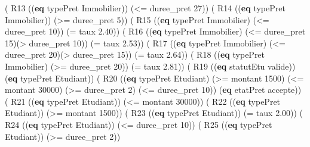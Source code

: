 \documentclass[
]{article}
\newenvironment{Shaded}{}{}
\newcommand{\DecValTok}[1]{\textcolor[rgb]{0.25,0.63,0.44}{#1}}
\newcommand{\FloatTok}[1]{\textcolor[rgb]{0.25,0.63,0.44}{#1}}
\newcommand{\KeywordTok}[1]{\textcolor[rgb]{0.00,0.44,0.13}{\textbf{#1}}}
\newcommand{\NormalTok}[1]{#1}
\newcommand{\OperatorTok}[1]{\textcolor[rgb]{0.40,0.40,0.40}{#1}}
\begin{document}
\begin{Shaded}
\begin{Highlighting}[]
\NormalTok{( R13 ((}\KeywordTok{eq}\NormalTok{ typePret Immobilier)) (}\OperatorTok{\textless{}=}\NormalTok{ duree\_pret }\DecValTok{27}\NormalTok{))}
\NormalTok{( R14 ((}\KeywordTok{eq}\NormalTok{ typePret Immobilier)) (}\OperatorTok{\textgreater{}=}\NormalTok{ duree\_pret }\DecValTok{5}\NormalTok{))}
\NormalTok{( R15 ((}\KeywordTok{eq}\NormalTok{ typePret Immobilier) (}\OperatorTok{\textless{}=}\NormalTok{ duree\_pret }\DecValTok{10}\NormalTok{)) (}\OperatorTok{=}\NormalTok{ taux }\FloatTok{2.40}\NormalTok{))}
\NormalTok{( R16 ((}\KeywordTok{eq}\NormalTok{ typePret Immobilier) (}\OperatorTok{\textless{}=}\NormalTok{ duree\_pret }\DecValTok{15}\NormalTok{)(}\OperatorTok{\textgreater{}}\NormalTok{ duree\_pret }\DecValTok{10}\NormalTok{)) (}\OperatorTok{=}\NormalTok{ taux }\FloatTok{2.53}\NormalTok{))}
\NormalTok{( R17 ((}\KeywordTok{eq}\NormalTok{ typePret Immobilier) (}\OperatorTok{\textless{}=}\NormalTok{ duree\_pret }\DecValTok{20}\NormalTok{)(}\OperatorTok{\textgreater{}}\NormalTok{ duree\_pret }\DecValTok{15}\NormalTok{)) (}\OperatorTok{=}\NormalTok{ taux }\FloatTok{2.64}\NormalTok{))}
\NormalTok{( R18 ((}\KeywordTok{eq}\NormalTok{ typePret Immobilier) (}\OperatorTok{\textgreater{}=}\NormalTok{ duree\_pret }\DecValTok{20}\NormalTok{)) (}\OperatorTok{=}\NormalTok{ taux }\FloatTok{2.81}\NormalTok{))}
\NormalTok{( R19 ((}\KeywordTok{eq}\NormalTok{ statutEtu valide)) (}\KeywordTok{eq}\NormalTok{ typePret Etudiant))}
\NormalTok{( R20 ((}\KeywordTok{eq}\NormalTok{ typePret Etudiant) (}\OperatorTok{\textgreater{}=}\NormalTok{ montant }\DecValTok{1500}\NormalTok{) (}\OperatorTok{\textless{}=}\NormalTok{ montant }\DecValTok{30000}\NormalTok{) }
\NormalTok{(}\OperatorTok{\textgreater{}=}\NormalTok{ duree\_pret }\DecValTok{2}\NormalTok{) (}\OperatorTok{\textless{}=}\NormalTok{ duree\_pret }\DecValTok{10}\NormalTok{)) (}\KeywordTok{eq}\NormalTok{ etatPret accepte))}
\NormalTok{( R21 ((}\KeywordTok{eq}\NormalTok{ typePret Etudiant)) (}\OperatorTok{\textless{}=}\NormalTok{ montant }\DecValTok{30000}\NormalTok{))}
\NormalTok{( R22 ((}\KeywordTok{eq}\NormalTok{ typePret Etudiant)) (}\OperatorTok{\textgreater{}=}\NormalTok{ montant }\DecValTok{1500}\NormalTok{))}
\NormalTok{( R23 ((}\KeywordTok{eq}\NormalTok{ typePret Etudiant)) (}\OperatorTok{=}\NormalTok{ taux }\FloatTok{2.00}\NormalTok{))}
\NormalTok{( R24 ((}\KeywordTok{eq}\NormalTok{ typePret Etudiant)) (}\OperatorTok{\textless{}=}\NormalTok{ duree\_pret }\DecValTok{10}\NormalTok{))}
\NormalTok{( R25 ((}\KeywordTok{eq}\NormalTok{ typePret Etudiant)) (}\OperatorTok{\textgreater{}=}\NormalTok{ duree\_pret }\DecValTok{2}\NormalTok{))}


\end{Highlighting}
\end{Shaded}
\end{document}
